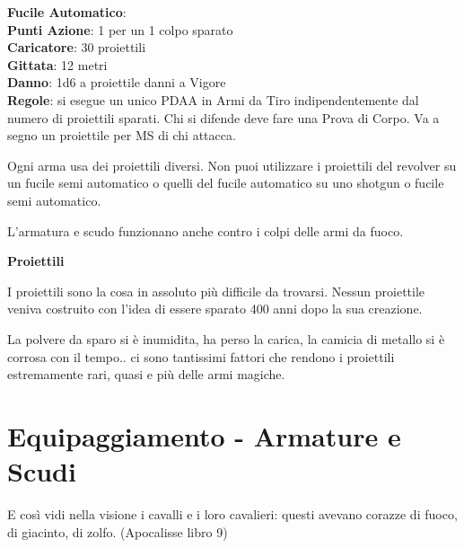 \documentclass[12pt,a4paper,twoside,openany]{book}
\begin{document}
\begin{multicols}{2}
\textbf{Fucile Automatico}:\\
\textbf{Punti Azione}: 1 per un 1 colpo sparato\\
\textbf{Caricatore}: 30 proiettili\\
\textbf{Gittata}: 12 metri\\
\textbf{Danno}: 1d6 a proiettile danni a Vigore\\
\textbf{Regole}: si esegue un unico PDAA in Armi da Tiro indipendentemente dal numero di proiettili sparati. Chi si difende deve fare una Prova di Corpo. Va a segno un proiettile per MS di chi attacca.

\bigskip

Ogni arma usa dei proiettili diversi. Non puoi utilizzare i proiettili del revolver su un fucile semi automatico o quelli del fucile automatico su uno shotgun o fucile semi automatico.

L'armatura e scudo funzionano anche contro i colpi delle armi da fuoco.

\begin{center}
	\textbf{Proiettili}
\end{center}

I proiettili sono la cosa in assoluto più difficile da trovarsi. Nessun proiettile veniva costruito con l'idea di essere sparato 400 anni dopo la sua creazione.

La polvere da sparo si è inumidita, ha perso la carica, la camicia di metallo si è corrosa con il tempo.. ci sono tantissimi fattori che rendono i proiettili estremamente rari, quasi e più delle armi magiche.

\end{multicols}

\pagebreak

\section{Equipaggiamento - Armature e Scudi} \hypertarget{equipaggiamento.armature.scudi}{}\label{equipaggiamentoarmature}

\label{equipaggiamento---armature-e-scudi}

\begin{changemargin}{0.3cm}{0.3cm}\begin{enfasi}{
E così vidi nella visione i cavalli e i loro cavalieri: questi avevano corazze di fuoco, di giacinto, di zolfo. (Apocalisse libro 9)} \end{enfasi}\end{changemargin}\medskip
\end{document}
